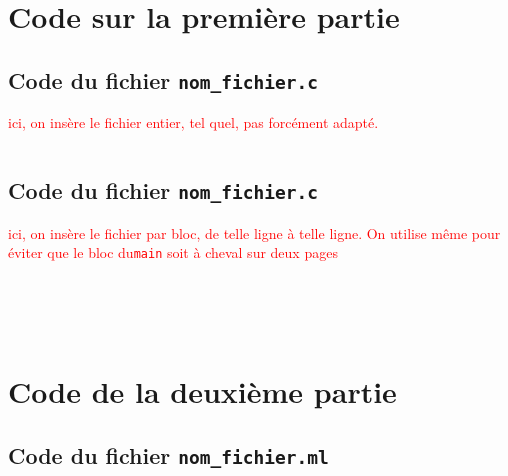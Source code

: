 \documentclass[12pt,a4paper,fleqn]{article}
\begin{document}
\pagestyle{fancy} %





\newpage
\section{Code sur la première partie}
\subsection{Code du fichier \texttt{nom_fichier.c}}
\textcolor{red}{ici, on insère le fichier entier, tel quel, pas forcément adapté.}
\inputminted{c}{code/triangle.c}


\subsection{Code du fichier \texttt{nom_fichier.c}}
\textcolor{red}{
ici, on insère le fichier par bloc, de telle ligne à telle ligne. 
On utilise même \texttt{\newpage} pour éviter que le bloc du\texttt{main} soit à cheval sur deux pages}
\inputminted[firstline=1,lastline=20]{c}{code/triangle.c}
\inputminted[firstline=25,lastline=27]{c}{code/triangle.c}
\inputminted[firstline=35,lastline=37]{c}{code/triangle.c}
\inputminted[firstline=55,lastline=102]{c}{code/triangle.c}
\newpage
\inputminted[firstline=105,lastline=148]{c}{code/triangle.c}

\newpage
\section{Code de la deuxième partie}
\subsection{Code du fichier \texttt{nom_fichier.ml}}

\inputminted{ocaml}{code/oppose.ml}
\end{document}
